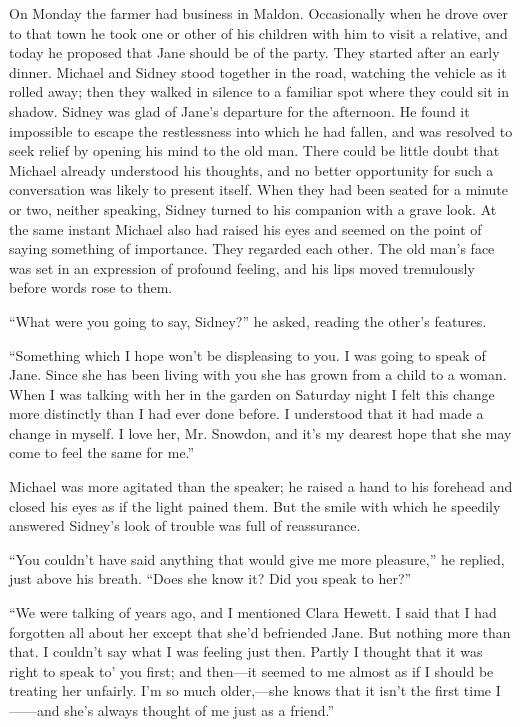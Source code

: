 On Monday the farmer had business in Maldon. Occasionally when he drove
over to that town he took one or other of his children with him to visit
a relative, and today he proposed that Jane should be of the party. They
started after an early dinner. Michael and Sidney stood together in the
road, watching the vehicle as it rolled away; then they walked in
silence to a familiar spot where they could sit in shadow. Sidney was
glad of Jane's departure for the afternoon. He found it impossible to
escape the restlessness into which he had fallen, and was resolved to
seek relief by opening his mind to the old man. There could be little
doubt that Michael already understood his thoughts, and no better
opportunity for such a conversation was likely to present itself. When
they {\protect\hypertarget{124}{}{}}had been seated for a minute or two,
neither speaking, Sidney turned to his companion with a grave look. At
the same instant Michael also had raised his eyes and seemed on the
point of saying something of importance. They regarded each other. The
old man's face was set in an expression of profound feeling, and his
lips moved tremulously before words rose to them.

``What were you going to say, Sidney?'' he asked, reading the other's
features.

``Something which I hope won't be displeasing to you. I was going to
speak of Jane. Since she has been living with you she has grown from a
child to a woman. When I was talking with her in the garden on Saturday
night I felt this change more distinctly than I had ever done before. I
understood that it had made a change in myself. I love her, Mr. Snowdon,
and it's my dearest hope that she may come to feel the same for me.''

Michael was more agitated than the speaker; he raised a hand to his
forehead and closed his eyes as if the light pained them. But the
{\protect\hypertarget{125}{}{}}smile with which he speedily answered
Sidney's look of trouble was full of reassurance.

``You couldn't have said anything that would give me more pleasure,'' he
replied, just above his breath. ``Does she know it? Did you speak to
her?''

``We were talking of years ago, and I mentioned Clara Hewett. I said
that I had forgotten all about her except that she'd befriended Jane.
But nothing more than that. I couldn't say what I was feeling just then.
Partly I thought that it was right to speak to' you first; and then---it
seemed to me almost as if I should be treating her unfairly. I'm so much
older,---she knows that it isn't the first time I{{------}}and she's
always thought of me just as a friend.''

